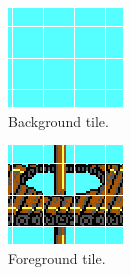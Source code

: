 \documentclass[book.tex]{subfiles}
\begin{document}
\begin{figure}[H]
\centering
\begin{subfigure}[t]{.245\textwidth}
  \centering
  \includegraphics[width=.9\textwidth]{screenshots_300dpi/game/tile_composite_1.png}
  \caption{Background tile.}
\end{subfigure}%
\begin{subfigure}[t]{.245\textwidth}
  \centering
  \includegraphics[width=.9\textwidth]{screenshots_300dpi/game/tile_composite_2.png}
  \caption{Foreground tile.}
\end{subfigure}
\begin{subfigure}[t]{.245\textwidth}
  \centering

\end{subfigure}
\end{figure}
\end{document}
